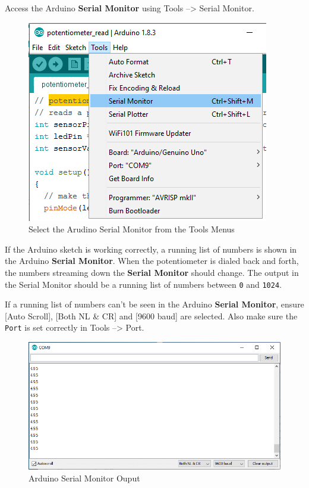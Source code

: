 \documentclass{book}
\makeatletter
\def\maxwidth{\ifdim\Gin@nat@width>\linewidth\linewidth
    \else\Gin@nat@width\fi}
\let\Oldincludegraphics\includegraphics
\renewcommand{\includegraphics}[1]{\Oldincludegraphics[width=.8\maxwidth]{#1}}
\makeatother
\begin{document}
Access the Arduino \textbf{Serial Monitor} using Tools --\textgreater{}
Serial Monitor.

\begin{figure}
\centering
\includegraphics{images/Tools_SerialMonitor.png}
\caption{Select the Arudino Serial Monitor from the Tools Menus}
\end{figure}
    




    
        If the Arduino sketch is working correctly, a running list of numbers is
shown in the Arduino \textbf{Serial Monitor}. When the potentiometer is
dialed back and forth, the numbers streaming down the \textbf{Serial
Monitor} should change. The output in the Serial Monitor should be a
running list of numbers between \lstinline!0! and \lstinline!1024!.

If a running list of numbers can't be seen in the Arduino \textbf{Serial
Monitor}, ensure {[}Auto Scroll{]}, {[}Both NL \& CR{]} and {[}9600
baud{]} are selected. Also make sure the \lstinline!Port! is set
correctly in Tools --\textgreater{} Port.

\begin{figure}
\centering
\includegraphics{images/serial_monitor_output.png}
\caption{Arduino Serial Monitor Ouput}
\end{figure}
    
\end{document}
